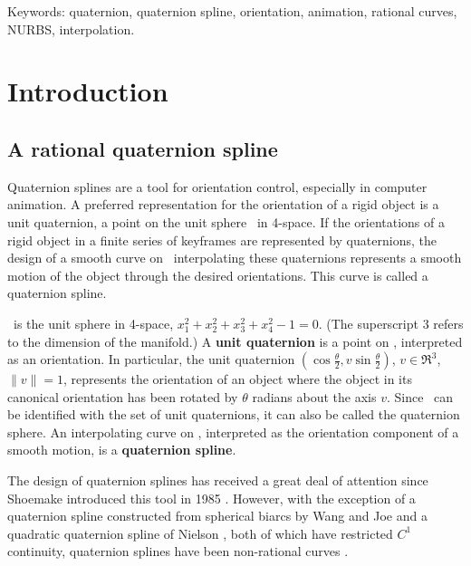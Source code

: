 Keywords: quaternion, quaternion spline, orientation, animation, 
	  rational curves, NURBS, interpolation.
\clearpage

\section{Introduction}
\label{sec:intro}

\subsection{A rational quaternion spline}

Quaternion splines are a tool for orientation control,
especially in computer animation.
A preferred representation for the orientation of a rigid object
is a unit quaternion, a point on the unit sphere \ in 4-space.
If the orientations of a rigid object in a finite series of keyframes are
represented by quaternions, the design of a smooth curve
on \ interpolating these quaternions represents a smooth
motion of the object through the desired orientations.
This curve is called a quaternion spline.

\begin{defn2}
\ is the unit sphere in 4-space, $x_1^2 + x_2^2 + x_3^2 + x_4^2 - 1 = 0$.
(The superscript 3 refers to the dimension of the manifold.)
A {\bf unit quaternion} is a point on , interpreted as an orientation.
In particular, the unit quaternion 
$(\cos \frac{\theta}{2}, v \sin \frac{\theta}{2})$, $v \in \Re^3$, $\|v\|=1$,
represents the orientation of an object
where the object in its canonical orientation 
has been rotated by $\theta$ radians about the axis $v$.
Since \ can be identified with the set of unit quaternions,
it can also be called the quaternion sphere.
An interpolating curve on ,
interpreted as the orientation component of a smooth motion,
is a {\bf quaternion spline}.
\end{defn2}

The design of quaternion splines has received a great deal
of attention since Shoemake introduced this tool in 1985 \cite{shoemake85}.
However, with the exception of a quaternion spline constructed
from spherical biarcs by Wang and Joe \cite{wang93}
and a quadratic quaternion spline of Nielson \cite{nielson92,nielson93},
both of which have restricted $C^1$ continuity,
quaternion splines have been non-rational curves 
\cite{shoemake85,duff85,pletinckx89,schlag91,barr92,nielson92,nielson93,nam95,park95,kim95,rama97}.


